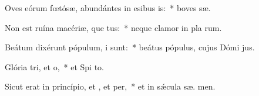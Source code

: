 \item Oves eórum fœtósæ, abundántes in esibus is:~* boves  sæ.
\item Non est ruína macériæ, que tus:~* neque clamor in pla rum.
\item Beátum dixérunt pópulum, i  sunt:~* beátus pópulus, cujus Dómi  jus.
\item Glória tri, et o,~* et Spi to.
\item Sicut erat in princípio, et , et per,~* et in sǽcula sæ. men.
